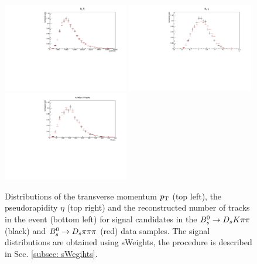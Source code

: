 \begin{figure}[h]
\includegraphics[height=7.cm,width=0.49\textwidth]{figs/Tagging/Bs_Pt_comparison.pdf}
\includegraphics[height=7.cm,width=0.49\textwidth]{figs/Tagging/Bs_eta_comparison.pdf}\\
\includegraphics[height=7.cm,width=0.49\textwidth]{figs/Tagging/nTracks_comparison.pdf}
\caption{Distributions of the transverse momentum $\mbox{$p_{\mathrm{ T}}$}$ (top left), 
the pseudorapidity $\eta$ (top right) and the reconstructed number of tracks in the event (bottom left) for signal candidates in the ${{B}^0_{s}}\rightarrow{\ensuremath{{D}_{s}}}{\ensuremath{K}}{\ensuremath{\pi}}{\ensuremath{\pi}}$ (black) and ${{B}^0_{s}}\rightarrow{\ensuremath{{D}_{s}}}{\ensuremath{\pi}}{\ensuremath{\pi}}{\ensuremath{\pi}}$ (red) data samples. 
The signal distributions are obtained using sWeights, the procedure is described in Sec. \ref{subsec: sWegihts}.}
\label{fig:kinematics_data_comparison}
\end{figure}



